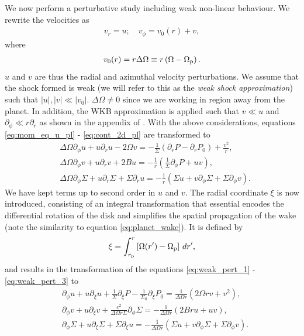 We now perform a perturbative study including weak non-linear behaviour.
We rewrite the velocities as 
\begin{align}
    v_r = u; \quad v_\phi = v_0(r) + v,
\end{align}
where
\begin{align}
    v_0(r) = r \Delta \Omega \equiv r \left( \Omega - \Omega_{\rm p} \right).
\end{align}
$u$ and $v$ are thus the radial and azimuthal velocity perturbations.
We assume that the shock formed is weak (we will refer to this as the \textit{weak shock approximation}) such that $|u|,|v| \ll |v_0|$. 
$\Delta \Omega \neq 0$ since we are working in region away from the planet.
In addition, the WKB approximation is applied such that $v \ll u$ and $\partial_\phi \ll r \partial_r$ as shown in the appendix of \citet{rafikov2002a}.
With the above considerations, equations \ref{eq:mom_eq_u_pl} - \ref{eq:cont_2d_pl} are transformed to 
\begin{align}
    &\Delta \Omega \partial_\phi u + u \partial_r u - 2 \Omega v = - \frac{1}{\Sigma} \left( \partial_r P - \partial_r P_0  \right) + \frac{v^2}{r}, \label{eq:weak_pert_1} \\
    &\Delta \Omega \partial_\phi v + u \partial_r v + 2Bu = - \frac{1}{r} \left( \frac{1}{\Sigma} \partial_\phi P +u v \right), \label{eq:weak_pert_2} \\
    &\Delta \Omega \partial_\phi \Sigma + u \partial_r \Sigma + \Sigma \partial_r u = - \frac{1}{r} \left( \Sigma u + v \partial_\phi \Sigma + \Sigma \partial_\phi v \right). \label{eq:weak_pert_3}
\end{align}
We have kept terms up to second order in $u$ and $v$.
The radial coordinate $\xi$ is now introduced, consisting of an integral transformation that essential encodes the differential rotation of the disk and simplifies the spatial propagation of the wake (note the similarity to equation \ref{eq:planet_wake}).
It is defined by
\begin{align}
    \xi = \int_{r_{\rm p}}^ r \left[ \Omega(r') - \Omega_{\rm p} \right] \, dr',
\end{align}
and results in the transformation of the equations \ref{eq:weak_pert_1} - \ref{eq:weak_pert_3} to
\begin{align}
    &\partial_\phi u + u \partial_\xi u + \frac{1}{\Sigma} \partial_\xi P - \frac{1}{\Sigma_0} \partial_\xi P_0 = \frac{1}{\Delta \Omega r} \left( 2 \Omega r v + v^2 \right), \label{eq:phi_xi_u} \\
    &\partial_\phi v + u \partial_\xi v + \frac{c^2}{\Delta \Omega r \Sigma} \partial_\phi \Sigma = - \frac{1}{\Delta \Omega r} \left( 2 B r u +uv \right), \label{eq:phi_xi_v} \\
    &\partial_\phi \Sigma + u \partial_\xi \Sigma + \Sigma \partial_\xi u = -\frac{1}{\Delta \Omega r} \left( \Sigma u + v \partial_\phi \Sigma + \Sigma \partial_\phi v \right). \label{eq:phi_xi_sigma}
\end{align}
